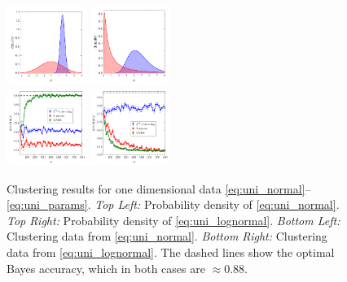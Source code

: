 \documentclass{article}
\begin{document}
\begin{figure}
\includegraphics[width=0.23\textwidth]{hist_normal.pdf}
\includegraphics[width=0.23\textwidth]{hist_lognormal.pdf}\\[-0.6em]
\includegraphics[width=0.23\textwidth]{1D_normal.pdf}
\includegraphics[width=0.23\textwidth]{1D_lognormal.pdf}
\caption{
\label{fig:1D}
Clustering results for one dimensional data
\eqref{eq:uni_normal}--\eqref{eq:uni_params}. \emph{Top Left:} Probability
density of \eqref{eq:uni_normal}. \emph{Top Right:} Probability
density of \eqref{eq:uni_lognormal}.
\emph{Bottom Left:} Clustering data from \eqref{eq:uni_normal}.
\emph{Bottom Right:} Clustering data from \eqref{eq:uni_lognormal}.
The dashed lines show the optimal Bayes accuracy, which in both cases 
are $\approx 0.88$.
}
\end{figure}
\end{document}
